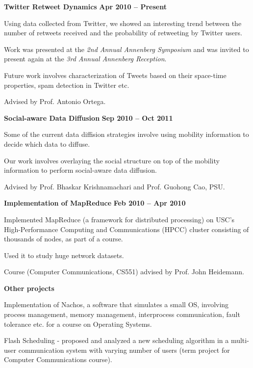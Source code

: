 \documentclass[margin,line]{resume}
\begin{document}
\begin{resume}
  \textbf{Twitter Retweet Dynamics} \hfill \textbf{Apr 2010 -- Present}
  \begin{list2}
   \item Using data collected from Twitter, we showed an interesting trend between the number of retweets received and the probability of retweeting by Twitter users. 
   \item Work was presented at the \textsl{2nd Annual Annenberg Symposium} and was invited to present again at the \textsl{3rd Annual Annenberg Reception}.
\newpage
   \item Future work involves characterization of Tweets based on their space-time properties, spam detection in Twitter etc. 
   \item Advised by Prof. Antonio Ortega.
  \end{list2}
  

  \textbf{Social-aware Data Diffusion} \hfill \textbf{Sep 2010 -- Oct 2011}
  \begin{list2}
   \item Some of the current data diffision strategies involve using mobility information to decide which data to diffuse. 
   \item Our work involves overlaying the social structure on top of the mobility information to perform social-aware data diffusion.
   \item Advised by Prof. Bhaskar Krishnamachari and Prof. Guohong Cao, PSU.
  \end{list2}

  \textbf{Implementation of MapReduce} \hfill \textbf{Feb 2010 -- Apr 2010}
  \begin{list2}
  \item Implemented MapReduce (a framework for distributed processing) on USC's High-Performance Computing and Communications (HPCC) cluster consisting of thousands of nodes, as part of a course. 
  \item Used it to study huge network datasets. 
  \item Course (Computer Communications, CS551) advised by Prof. John Heidemann. 
  \end{list2}
 
  \textbf{Other projects} 
  \begin{list2}   
   \item Implementation of Nachos, a software that simulates a small OS, involving process management, memory management, interprocess communication, fault tolerance etc. for a course on Operating Systems.
   \item Flash Scheduling - proposed and analyzed a new scheduling algorithm in a multi-user communication system with varying number of users (term project for Computer Communications course).
  \end{list2}



\end{resume}
\end{document}
